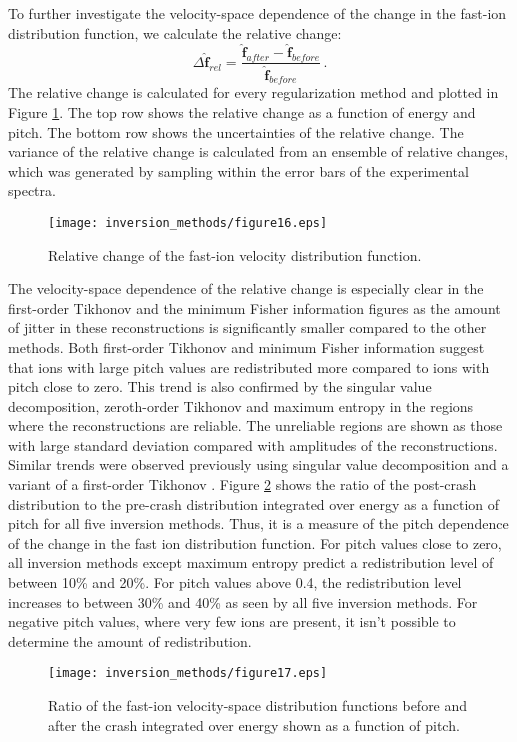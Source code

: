 To further investigate the velocity-space dependence of the change in the fast-ion distribution function, we calculate the relative change:
\begin{equation}
\Delta \mathbf{\hat{f}}_{rel} = \frac{\mathbf{\hat{f}}_{after} - \mathbf{\hat{f}}_{before}}{\mathbf{\hat{f}}_{before}}  \, .
\end{equation}
The relative change is calculated for every regularization method and plotted in Figure \ref{fig:tomos_sawtooth_rel}. 
The top row shows the relative change as a function of energy and pitch. The bottom row shows the uncertainties of the relative change.
The variance of the relative change is calculated from an ensemble of relative changes, which was generated by sampling within the error bars of the experimental spectra.
\begin{figure}[h!]
    \centering
    \texttt{[image: inversion\_methods/figure16.eps]}
    \caption{Relative change of the fast-ion velocity distribution function.} \label{fig:tomos_sawtooth_rel}
\end{figure}
The velocity-space dependence of the relative change is especially clear in the first-order Tikhonov and the minimum Fisher information figures as the amount of jitter in these reconstructions is significantly smaller compared to the other methods. 
Both first-order Tikhonov and minimum Fisher information suggest that ions with large pitch values are redistributed more compared to ions with pitch close to zero. 
This trend is also confirmed by the singular value decomposition, zeroth-order Tikhonov and maximum entropy in the regions where the reconstructions are reliable.
The unreliable regions are shown as those with large standard deviation compared with amplitudes of the reconstructions. 
Similar trends were observed previously using singular value decomposition \cite{Geiger2015} and a variant of a first-order Tikhonov \cite{Weiland2015}.
Figure \ref{fig:tomos_sawtooth_rel_1D} shows the ratio of the post-crash distribution to the pre-crash distribution integrated over energy as a function of pitch for all five inversion methods. Thus, it is a measure of the pitch dependence of the change in the fast ion distribution function. 
For pitch values close to zero, all inversion methods except maximum entropy predict a redistribution level of between 10\% and 20\%.
For pitch values above 0.4, the redistribution level increases to between 30\% and 40\% as seen by all five inversion methods. For negative pitch values, where very few ions are present, it isn't possible to determine the amount of redistribution.
\begin{figure}[h!]
    \centering
    \texttt{[image: inversion\_methods/figure17.eps]}
    \caption{Ratio of the fast-ion velocity-space distribution functions before and after the crash integrated over energy shown as a function of pitch.} \label{fig:tomos_sawtooth_rel_1D}
\end{figure}

